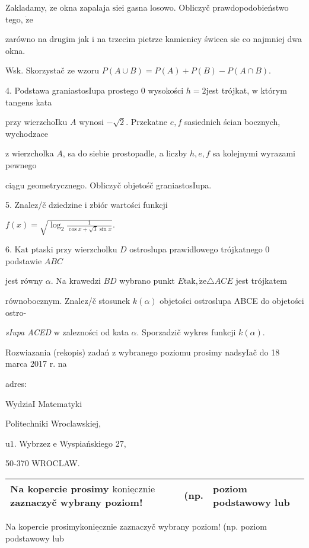 \documentclass[a4paper,12pt]{article}
\begin{document}
Zakladamy, $\dot{\mathrm{z}}\mathrm{e}$ okna zapalaja $\mathrm{s}\mathrm{i}\mathrm{e}\mathrm{i}$ gasna losowo. Obliczyč prawdopodobieństwo tego, $\dot{\mathrm{z}}\mathrm{e}$

zarówno na drugim jak $\mathrm{i}$ na trzecim pietrze kamienicy świeca $\mathrm{s}\mathrm{i}\mathrm{e}$ co najmniej dwa okna.

Wsk. Skorzystač ze wzoru $P(A\cup B)=P(A)+P(B)-P(A\cap B).$

4. Podstawa graniastosIupa prostego $0$ wysokości $h=2$jest trójkat, $\mathrm{w}$ którym tangens kata

przy wierzchoIku $A$ wynosi $-\sqrt{2}$. Przekatne $e, f$ sasiednich ścian bocznych, wychodzace

$\mathrm{z}$ wierzcholka $A$, sa do siebie prostopadle, a liczby $h, e, f$ sa kolejnymi wyrazami pewnego

ciągu geometrycznego. Obliczyč objetośč graniastosIupa.

5. Znalez/č dziedzine $\mathrm{i}$ zbiór wartości funkcji

$f(x)=\sqrt{\log_{2}\frac{1}{\cos x+\sqrt{3}\sin x}}.$

6. $\mathrm{K}\mathrm{a}\mathrm{t}$ ptaski przy wierzcholku $D$ ostroslupa prawidlowego trójkatnego $0$ podstawie $ABC$

jest równy $\alpha$. Na krawedzi $BD$ wybrano punkt $E \mathrm{t}\mathrm{a}\mathrm{k}, \dot{\mathrm{z}}\mathrm{e} \triangle ACE$ jest trójkatem

równobocznym. Znalez/č stosunek $k(\alpha)$ objetości ostroslupa ABCE do objetości ostro-

{\it sIupa ACED} $\mathrm{w}$ zalezności od kata $\alpha$. Sporzadzič wykres funkcji $k(\alpha).$

Rozwiazania (rekopis) zadań $\mathrm{z}$ wybranego poziomu prosimy nadsyIač do 18 marca 2017 $\mathrm{r}$. na

adres:

WydziaI Matematyki

Politechniki Wroclawskiej,

$\mathrm{u}1$. Wybrzez $\mathrm{e}$ Wyspiańskiego 27,

50-370 WROCLAW.
\begin{center}
\begin{tabular}{|l|l|l|}
\hline
\multicolumn{1}{|l|}{Na kopercie prosimy $\underline{\mathrm{k}\mathrm{o}\mathrm{n}\mathrm{i}\mathrm{e}\mathrm{c}\mathrm{z}\mathrm{n}\mathrm{i}\mathrm{e}}$ zaznaczyč wybrany poziom!}&	\multicolumn{1}{|l|}{(np.}&	\multicolumn{1}{|l|}{poziom podstawowy lub}	\\
\hline
\end{tabular}

\end{center}
Na kopercie prosimy$\underline{\mathrm{k}\mathrm{o}\mathrm{n}\mathrm{i}\mathrm{e}\mathrm{c}\mathrm{z}\mathrm{n}\mathrm{i}\mathrm{e}}$ zaznaczyč wybrany poziom! (np. poziom podstawowy lub
\end{document}
